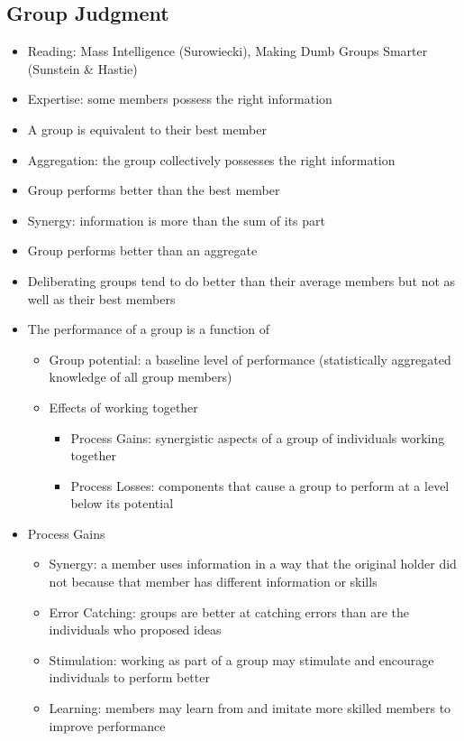 \documentclass[12pt]{article}
\begin{document}
\subsection{Group Judgment}
\begin{itemize}
\item Reading: Mass Intelligence (Surowiecki), Making Dumb Groups Smarter (Sunstein \& Hastie)
\item Expertise: some members possess the right information
\item A group is equivalent to their best member 
\item Aggregation: the group collectively possesses the right information
\item Group performs better than the best member 
\item Synergy: information is more than the sum of its part 
\item Group performs better than an aggregate 
\item Deliberating groups tend to do better than their average members but not as well as their best members 
\item The performance of a group is a function of \begin{itemize} 
\item Group potential: a baseline level of performance (statistically aggregated knowledge of all group members)
\item Effects of working together \begin{itemize} 
\item Process Gains: synergistic aspects of a group of individuals working together 
\item Process Losses: components that cause a group to perform at a level below its potential \end{itemize} \end{itemize} 
\item Process Gains \begin{itemize} 
\item Synergy: a member uses information in a way that the original holder did not because that member has different information or skills 
\item Error Catching: groups are better at catching errors than are the individuals who proposed ideas 
\item Stimulation: working as part of a group may stimulate and encourage individuals to perform better 
\item Learning: members may learn from and imitate more skilled members to improve performance \end{itemize} 

\end{itemize}
\end{document}
